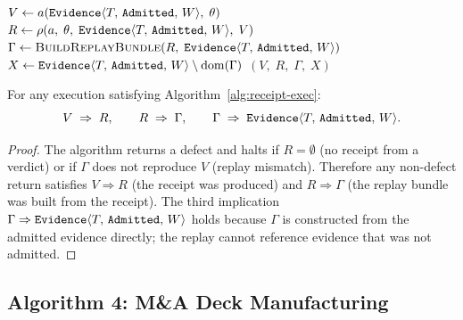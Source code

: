 \begin{algorithm}[H]
\caption{Receipt-Bearing Execution}
\label{alg:receipt-exec}
\DontPrintSemicolon
{}
\BlankLine
$V \leftarrow a(\texttt{Evidence}\langle T,\, \texttt{Admitted},\, W \rangle,\; \theta)$\;
\BlankLine
{}
$R \leftarrow \rho(a,\; \theta,\; \texttt{Evidence}\langle T,\, \texttt{Admitted},\, W \rangle,\; V)$\;
\BlankLine
{}
$\Gamma \leftarrow \textsc{BuildReplayBundle}(R,\;
  \texttt{Evidence}\langle T,\, \texttt{Admitted},\, W \rangle)$\;
\BlankLine
{}
$X \leftarrow \texttt{Evidence}\langle T,\, \texttt{Admitted},\, W \rangle \setminus
  \mathrm{dom}(\Gamma)$\;
\BlankLine
{}
\Return $(V,\; R,\; \Gamma,\; X)$\;
\end{algorithm}

\begin{theorem}
\label{thm:exec-invariant}
For any execution satisfying Algorithm~\ref{alg:receipt-exec}:
\[
  V \;\Rightarrow\; R, \qquad
  R \;\Rightarrow\; \Gamma, \qquad
  \Gamma \;\Rightarrow\; \texttt{Evidence}\langle T,\, \texttt{Admitted},\, W \rangle.
\]
\end{theorem}

\begin{proof}
The algorithm returns a defect and halts if $R = \emptyset$ (no receipt from
a verdict) or if $\Gamma$ does not reproduce $V$ (replay mismatch). Therefore
any non-defect return satisfies $V \Rightarrow R$ (the receipt was produced)
and $R \Rightarrow \Gamma$ (the replay bundle was built from the receipt).
The third implication $\Gamma \Rightarrow \texttt{Evidence}\langle T,\, \texttt{Admitted},\, W \rangle$
holds because $\Gamma$ is constructed from the admitted evidence directly;
the replay cannot reference evidence that was not admitted.
\end{proof}

\subsection{Algorithm 4: M\&A Deck Manufacturing}
\label{sec:pi-alg4}

